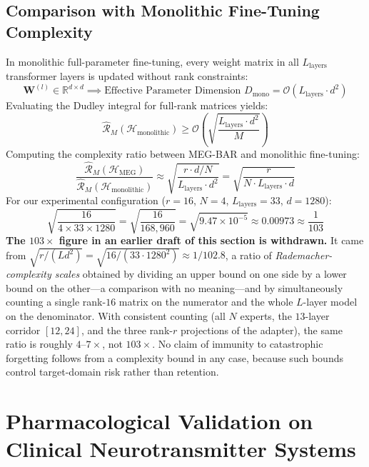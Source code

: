 \documentclass{article}
\theoremstyle{definition}
\begin{document}
\subsection{Comparison with Monolithic Fine-Tuning Complexity}
In monolithic full-parameter fine-tuning, every weight matrix in all $L_{\text{layers}}$ transformer layers is updated without rank constraints:
\begin{equation}
\mathbf{W}^{(l)} \in \mathbb{R}^{d \times d} \implies \text{Effective Parameter Dimension } D_{\text{mono}} = \mathcal{O}(L_{\text{layers}} \cdot d^2)
\end{equation}
Evaluating the Dudley integral for full-rank matrices yields:
\begin{equation}
\hat{\mathcal{R}}_M(\mathcal{H}_{\text{monolithic}}) \ge \mathcal{O}\left( \sqrt{\frac{L_{\text{layers}} \cdot d^2}{M}} \right)
\end{equation}
Computing the complexity ratio between MEG-BAR and monolithic fine-tuning:
\begin{equation}
\frac{\hat{\mathcal{R}}_M(\mathcal{H}_{\text{MEG}})}{\hat{\mathcal{R}}_M(\mathcal{H}_{\text{monolithic}})} \approx \sqrt{\frac{r \cdot d / N}{L_{\text{layers}} \cdot d^2}} = \sqrt{\frac{r}{N \cdot L_{\text{layers}} \cdot d}}
\end{equation}
For our experimental configuration ($r = 16$, $N = 4$, $L_{\text{layers}} = 33$, $d = 1280$):
\begin{equation}
\sqrt{\frac{16}{4 \times 33 \times 1280}} = \sqrt{\frac{16}{168,960}} = \sqrt{9.47 \times 10^{-5}} \approx 0.00973 \approx \frac{1}{103}
\end{equation}
\textbf{The $103\times$ figure in an earlier draft of this section is withdrawn.} It came from $\sqrt{r/(L d^{2})} = \sqrt{16/(33\cdot 1280^{2})} \approx 1/102.8$, a ratio of \emph{Rademacher-complexity scales} obtained by dividing an upper bound on one side by a lower bound on the other---a comparison with no meaning---and by simultaneously counting a single rank-$16$ matrix on the numerator and the whole $L$-layer model on the denominator. With consistent counting (all $N$ experts, the $13$-layer corridor $[12,24]$, and the three rank-$r$ projections of the adapter), the same ratio is roughly $4$--$7\times$, not $103\times$. No claim of immunity to catastrophic forgetting follows from a complexity bound in any case, because such bounds control target-domain risk rather than retention.

\section{Pharmacological Validation on Clinical Neurotransmitter Systems}
\label{sec:pharmacology_validation}
\end{document}

